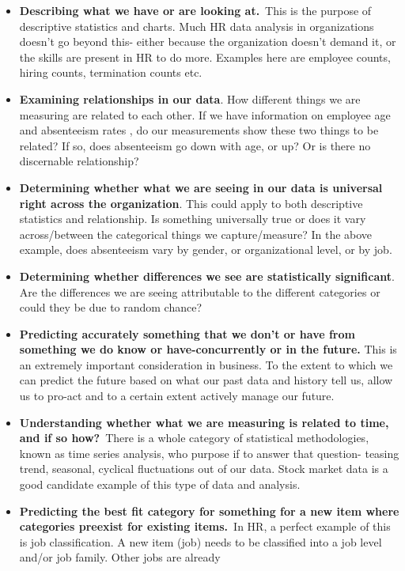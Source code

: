 \documentclass[
]{article}
\begin{document}
\begin{itemize}
\item
  \textbf{Describing what we have or are looking at.}~This is the
  purpose of descriptive statistics and charts. Much HR data analysis in
  organizations doesn't go beyond this- either because the organization
  doesn't demand it, or the skills are present in HR to do more.
  Examples here are employee counts, hiring counts, termination counts
  etc.
\item
  \textbf{Examining relationships in our data}. How different things we
  are measuring are related to each other. If we have information on
  employee age and absenteeism rates , do our measurements show these
  two things to be related? If so, does absenteeism go down with age, or
  up? Or is there no discernable relationship?
\item
  \textbf{Determining whether what we are seeing in our data is
  universal right across the organization}. This could apply to both
  descriptive statistics and relationship. Is something universally true
  or does it vary across/between the categorical things we
  capture/measure? In the above example, does absenteeism vary by
  gender, or organizational level, or by job.
\item
  \textbf{Determining whether differences we see are statistically
  significant}. Are the differences we are seeing attributable to the
  different categories or could they be due to random chance?
\item
  \textbf{Predicting accurately something that we don't or have from
  something we do know or have-concurrently or in the future.} This is
  an extremely important consideration in business. To the extent to
  which we can predict the future based on what our past data and
  history tell us, allow us to pro-act and to a certain extent actively
  manage our future.
\item
  \textbf{Understanding whether what we are measuring is related to
  time, and if so how?}~There is a whole category of statistical
  methodologies, known as time series analysis, who purpose if to answer
  that question- teasing trend, seasonal, cyclical fluctuations out of
  our data. Stock market data is a good candidate example of this type
  of data and analysis.
\item
  \textbf{Predicting the best fit category for something for a new item
  where categories preexist for existing items.}~In HR, a perfect
  example of this is job classification. A new item (job) needs to be
  classified into a job level and/or job family. Other jobs are already

\end{itemize}
\end{document}

